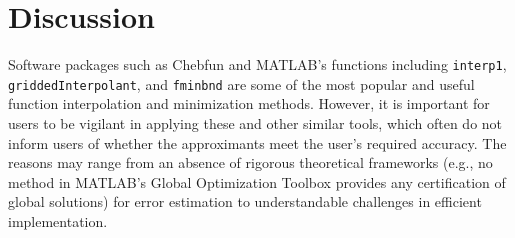\documentclass[review]{elsarticle}
\newcommand{\abstol}{\varepsilon}
\theoremstyle{definition}
\newtheorem{exmp}{Example}
\newcommand{\funappxg}{\texttt{funappx\_g}\xspace}
\newcommand{\funming}{\texttt{funmin\_g\xspace}}
\newcommand{\integralg}{\texttt{integral\_g\xspace}}
\begin{document}
\begin{comment}
\begin{exmp}
In this example, we consider the function $f_4(x) = sin(10 \pi x^4) + x$, which
is increasing oscillating over the interval $[0,2]$. We use \funappxg, \funming,
and \integralg to approximate the function, locate its global minimum, and
estimate its integral with $\abstol = 10^{-8}$. With $1,972,359$ points,
\funappxg can approximate $f_4$ uniformly accurate as shown in
Figure~\ref{f4fig}(a). The true global minimum is $(0.6212340312,
-0.3782149854)$ and the absolute approximation error of \funming using
$n=2,022,621$ points is $(1.4\times 10^{-7}, 4.7\times 10^{-11})$. The integral
$\int_{0}^{2} f_4 (x) dx = 2.145517314$ and the approximation error of
\integralg is $4.7\times10^{-10}$ using $4,965,641$ points.

\begin{figure}[bt]
\centering
\texttt{[image: figure/f4\_funappx\_error.eps]} \hspace{-5ex}
\texttt{[image: figure/f4\_funmin\_g.eps]}
\caption{The example $f_4$ with errors of interpolants from \funappxg (left) and
minimum found by \funming (right).}
\label{f4fig}
\end{figure}
\end{exmp}
\end{comment}


\begin{comment}
Our algorithm is readily extensible to the following complex-valued function.
\begin{exmp}
This example is taken from MATLAB's documentation for \texttt{interp1}. Define
the complex valued function $v(x) = 5x + x^2 i$ for $x \in [1,10]$. It is clear
that the real part of $v$ is $5x$ and the imaginary part is $x^2$. We could
apply \funappxg to approximate the two parts separately. However, it is
unnecessary.
\end{exmp}
\end{comment}



\section{Discussion}

Software packages such as Chebfun and MATLAB's functions including
\texttt{interp1}, \texttt{griddedInterpolant}, and \texttt{fminbnd} are some of
the most popular and useful function interpolation and minimization methods.
However, it is important for users to be vigilant in applying these and other
similar tools, which often do not inform users of whether the approximants meet
the user's required accuracy. The reasons may range from an absence of rigorous
theoretical frameworks (e.g., no method in MATLAB's Global Optimization Toolbox
provides any certification of global solutions) for error estimation to
understandable challenges in efficient implementation.
\end{document}
